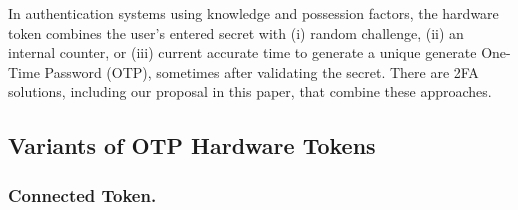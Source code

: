 In authentication systems using knowledge and possession factors, the hardware token combines the user's entered secret with  (i) random challenge, (ii) an internal counter, or (iii) current accurate time to generate a unique generate One-Time Password (OTP), sometimes after validating the secret. There are 2FA solutions, including our proposal in this paper, that combine these approaches.


%
%
%
%
%
%
%
%
%
%
%
%



\subsection{Variants of OTP Hardware Tokens}

\subsubsection{Connected Token.}


